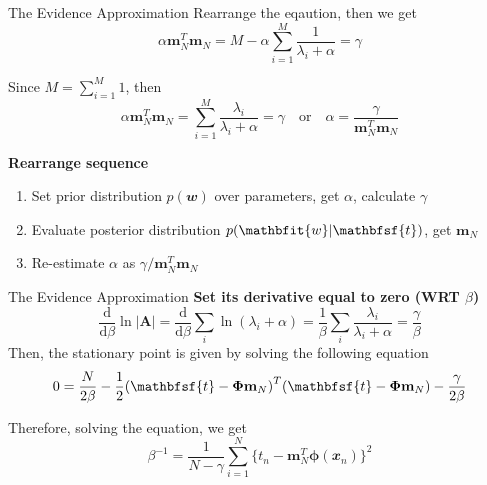 \documentclass{bredelebeamer}
\begin{document}
\begin{frame}{The Evidence Approximation}
  Rearrange the eqaution, then we get
  \begin{equation}
    \alpha \mathbf{m}_N^T \mathbf{m}_N = M - \alpha \sum_{i=1}^{M} \frac{1}{\lambda_i + \alpha} = \gamma
  \end{equation}

  Since $M = \sum_{i=1}^M 1$, then
  \begin{equation}
    \alpha \mathbf{m}_N^T\mathbf{m}_N = \sum_{i=1}^{M} \frac{\lambda_i}{\lambda_i + \alpha} = \gamma
    \quad \textrm{or} \quad
    \alpha = \frac{\gamma}{\mathbf{m}_N^T \mathbf{m}_N}
  \end{equation}

  \textbf{Rearrange sequence} \\
  \begin{enumerate}
    \item Set prior distribution $p(\mathbfit{w})$ over parameters, get $\alpha$, calculate $\gamma$
    \item Evaluate posterior distribution $p(\mathbfit{w}|\mathbfsf{t})$, get $\mathbf{m}_N$
    \item Re-estimate $\alpha$ as $\gamma / \mathbf{m}_N^T \mathbf{m}_N$
  \end{enumerate}
\end{frame}

\begin{frame}{The Evidence Approximation}
  \textbf{Set its derivative equal to zero (WRT $\beta$)} \\
  \begin{equation}
    \frac{\mathrm{d}}{\mathrm{d}\beta} \ln{|\mathbf{A}|}
    = \frac{\mathrm{d}}{\mathrm{d}\beta} \sum_i \ln(\lambda_i + \alpha)
    = \frac{1}{\beta} \sum_i \frac{\lambda_i}{\lambda_i+\alpha} = \frac{\gamma}{\beta}
  \end{equation}
  Then, the stationary point is given by solving the following equation
  \begin{equation}
    0
    = \frac{N}{2\beta}
    - \frac{1}{2} {(\mathbfsf{t}-\boldsymbol{\Phi}\mathbf{m}_N)}^T{(\mathbfsf{t}-\boldsymbol{\Phi}\mathbf{m}_N)}
    - \frac{\gamma}{2\beta}
  \end{equation}

  Therefore, solving the equation, we get
  \begin{equation}
    \beta^{-1}
    = \frac{1}{N-\gamma} \sum_{i=1}^N {\{t_n - \mathbf{m}_N^T \boldsymbol{\phi}(\mathbfit{x}_n)\}}^2
  \end{equation}
\end{frame}
\end{document}
